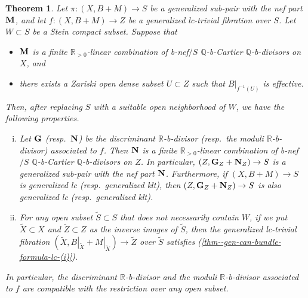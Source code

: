\documentclass[12pt]{amsart}
\newtheorem{thm}{Theorem}[section]
\theoremstyle{definition}
\begin{document}
\begin{thm}\label{thm--gen-can-bundle-formula-lc}
Let $\pi \colon (X,B+M) \to S$ be a generalized sub-pair with the nef part $\boldsymbol{\rm M}$, and let $f\colon (X,B+M) \to Z$ be a generalized lc-trivial fibration over $S$. 
Let $W \subset S$ be a Stein compact subset. 
Suppose that
\begin{itemize}
\item
$\boldsymbol{\rm M}$ is a finite $\mathbb{R}_{>0}$-linear combination of b-nef$/S$ $\mathbb{Q}$-b-Cartier $\mathbb{Q}$-b-divisors on $X$, and
\item
there exists a Zariski open dense subset $U \subset Z$ such that $B|_{f^{-1}(U)}$ is effective.
\end{itemize}
Then, after replacing $S$ with a suitable open neighborhood of $W$, we have the following properties.
\begin{enumerate}[(i)]
\item \label{thm--gen-can-bundle-formula-lc-(i)}
Let $\boldsymbol{\rm G}$ (resp.~$\boldsymbol{\rm N}$) be the discriminant $\mathbb{R}$-b-divisor (resp.~the moduli $\mathbb{R}$-b-divisor) associated to $f$. 
Then $\boldsymbol{\rm N}$ is a finite $\mathbb{R}_{>0}$-linear combination of b-nef$/S$ $\mathbb{Q}$-b-Cartier $\mathbb{Q}$-b-divisors on $Z$. 
In particular, $(Z, \boldsymbol{\rm G}_{Z} +\boldsymbol{\rm N}_{Z}) \to S$ is a generalized sub-pair with the nef part $\boldsymbol{\rm N}$. 
Furthermore, if $(X,B+M) \to S$ is generalized lc (resp.~generalized klt), then $(Z, \boldsymbol{\rm G}_{Z} +\boldsymbol{\rm N}_{Z}) \to S$ is also generalized lc (resp.~generalized klt). 
\item \label{thm--gen-can-bundle-formula-lc-(ii)}
For any open subset $\tilde{S} \subset S$ that does not necessarily contain $W$, if we put $\tilde{X} \subset X$ and $\tilde{Z} \subset Z$ as the inverse images of $\tilde{S}$, then the generalized lc-trivial fibration $(\tilde{X}, B|_{\tilde{X}}+M|_{\tilde{X}}) \to \tilde{Z}$ over $\tilde{S}$ satisfies (\ref{thm--gen-can-bundle-formula-lc-(i)}). 
\end{enumerate}
In particular, the discriminant $\mathbb{R}$-b-divisor and the moduli $\mathbb{R}$-b-divisor associated to $f$ are compatible with the restriction over any open subset.  
\end{thm}
\end{document}
